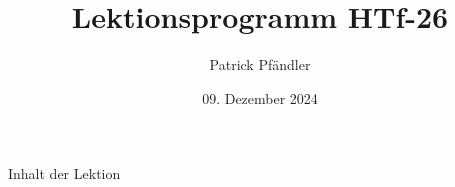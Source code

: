     

    \title{\textbf{Lektionsprogramm HTf-26}}
    \author{Patrick Pfändler}
    \date{09. Dezember 2024}


    

    \frame{\titlepage}

    \begin{frame}{Inhalt der Lektion}
        \tableofcontents
    \end{frame}






    
    
    
    

